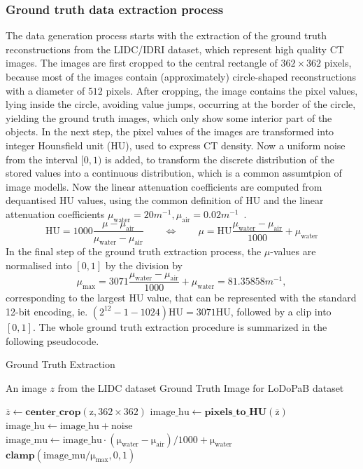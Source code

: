 \documentclass[12pt,a4paper]{article}
\begin{document}
\subsubsection{Ground truth data extraction process}
The data generation process starts with the extraction of the ground truth reconstructions from the LIDC/IDRI dataset, which represent high quality CT images. The images are first cropped to the central rectangle of $362 \times 362$ pixels, because most of the images contain (approximately) circle-shaped reconstructions with a diameter of $512$ pixels. After cropping, the image contains the pixel values, lying inside the circle, avoiding value jumps, occurring at the border of the circle, yielding the ground truth images, which only show some interior part of the objects.
\newline\newline
In the next step, the pixel values of the images are transformed into integer Hounsfield unit (HU), used to express CT density. Now a uniform noise from the interval $[0,1)$ is added, to transform the discrete distribution of the stored values into a continuous distribution, which is a common assumtpion of image modells. Now the linear attenuation coefficients are computed from dequantised HU values, using the common definition of HU and the linear attenuation coefficients $\mu_\mathrm{water} = 20m^{-1}, \mu_\mathrm{air} = 0.02m^{-1}$~\cite{leuschner2022lodopab}.
\begin{equation}
    \mathrm{HU} = 1000 \frac{\mu - \mu_\mathrm{air}}{\mu_\mathrm{water} - \mu_\mathrm{air}} \qquad \Leftrightarrow \qquad \mu = \mathrm{HU} \frac{\mu_\mathrm{water} - \mu_\mathrm{air}}{1000} + \mu_\mathrm{water}
\end{equation}
In the final step of the ground truth extraction process, the $\mu$-values are normalised into $[0,1]$ by the division by 
\begin{equation}
    \mu_\mathrm{max} = 3071 \frac{\mu_\mathrm{water} - \mu_\mathrm{air}}{1000} + \mu_\mathrm{water} = 81.35858 m^{-1},
\end{equation}
corresponding to the largest HU value, that can be represented with the standard 12-bit encoding, ie. $(2^{12} - 1 - 1024) \mathrm{HU} = 3071\mathrm{HU}$, followed by a clip into $[0,1]$. The whole ground truth extraction procedure is summarized in the following pseudocode.

\begin{algorithm}
\caption{Ground Truth Extraction}\label{alg:gt_ext}
\begin{algorithmic}[1] %
\Require An image $z$ from the LIDC dataset
\Ensure Ground Truth Image for LoDoPaB dataset 

\State $\overline{z} \gets \mathrm{\textbf{center\_crop}(z, 362 \times 362)}$
\State $\mathrm{image\_hu \gets \textbf{pixels\_to\_HU}(\overline{z})}$
\State $\mathrm{image\_hu \gets image\_hu + noise}$
\State $\mathrm{image\_mu} \gets \mathrm{image\_hu \cdot (\mu_{water} - \mu_{air})/1000 + \mu_{water}}$
\State \Return $\mathrm{\textbf{clamp}(image\_mu/\mu_{max}, 0, 1)}$
\end{algorithmic}
\end{algorithm}
\end{document}
